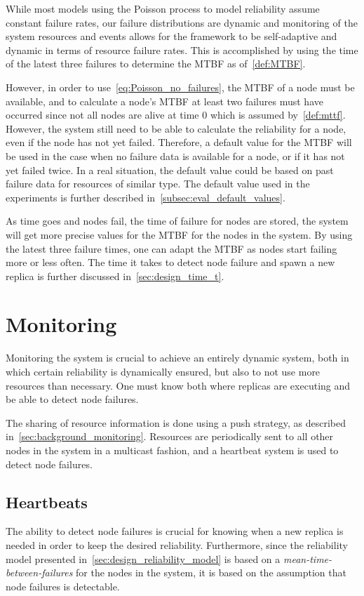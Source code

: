 \documentclass{cslthse-msc}
\begin{document}
While most models using the Poisson process to model reliability assume constant failure rates, our failure distributions are dynamic and monitoring of the system resources and events allows for the framework to be self-adaptive and dynamic in terms of resource failure rates. This is accomplished by using the time of the latest three failures to determine the MTBF as of~\cref{def:MTBF}. 

However, in order to use~\cref{eq:Poisson_no_failures}, the MTBF of a node must be available, and to calculate a node's MTBF at least two failures must have occurred since not all nodes are alive at time 0 which is assumed by~\cref{def:mttf}. However, the system still need to be able to calculate the reliability for a node, even if the node has not yet failed. Therefore, a default value for the MTBF will be used in the case when no failure data is available for a node, or if it has not yet failed twice. In a real situation, the default value could be based on past failure data for resources of similar type. The default value used in the experiments is further described in~\cref{subsec:eval_default_values}.

As time goes and nodes fail, the time of failure for nodes are stored, the system will get more precise values for the MTBF for the nodes in the system. By using the latest three failure times, one can adapt the MTBF as nodes start failing more or less often. The time it takes to detect node failure and spawn a new replica is further discussed in~\cref{sec:design_time_t}.


\section{Monitoring} \label{sec:design_monitoring}
Monitoring the system is crucial to achieve an entirely dynamic system, both in which certain reliability is dynamically ensured, but also to not use more resources than necessary. One must know both where replicas are executing and be able to detect node failures.

The sharing of resource information is done using a push strategy, as described in~\cref{sec:background_monitoring}. Resources are periodically sent to all other nodes in the system in a multicast fashion, and a heartbeat system is used to detect node failures.

\subsection{Heartbeats} \label{subsec:heartbeats}
The ability to detect node failures is crucial for knowing when a new replica is needed in order to keep the desired reliability. Furthermore, since the reliability model presented in~\cref{sec:design_reliability_model} is based on a \emph{mean-time-between-failures} for the nodes in the system, it is based on the assumption that node failures is detectable. 
\end{document}
